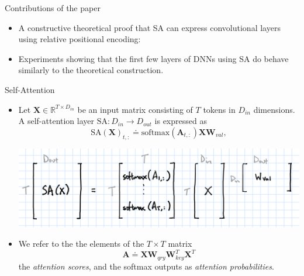 \documentclass[9pt]{beamer}
\newcommand{\bb}{\mathbb}
\newcommand{\mb}{\bm}
\begin{document}
\begin{frame}{Contributions of the paper}
\begin{itemize}
\item A constructive theoretical proof that SA can express convolutional layers using relative positional encoding:
\end{itemize}

\begin{center}
\vspace{.15in}
\noindent{}
\vspace{.2in}
\end{center}

\begin{itemize}
\item Experiments showing that the first few layers of DNNs using SA do behave similarly to the theoretical construction.
\end{itemize}
\end{frame}


\begin{frame}{Self-Attention}
\begin{itemize}
\item Let $\bm X\in\bb R^{T\times D_{in}}$ be an input matrix consisting of $T$ tokens in $D_{in}$ dimensions. A self-attention layer $\mathrm{SA}:D_{in}\rightarrow D_{out}$ is expressed as
\begin{equation}
  \mathrm{SA}(\mb X)_{t,:} \doteq \mathrm{softmax}(\mb A_{t,:})\mb X\mb W_{val},
\end{equation}
\begin{center}
    \includegraphics[width=.7\textwidth]{images/softmax.png}
\end{center}
\vspace{.1in}

\item We refer to the the elements of the $T\times T$ matrix
\begin{equation}
\mb A \doteq \mb X \mb W_{qry}\mb W_{key}^T\mb X^T
\end{equation}
the {\em attention scores}, and the softmax outputs as {\em attention probabilities}.
\end{itemize}
\end{frame}
\end{document}
